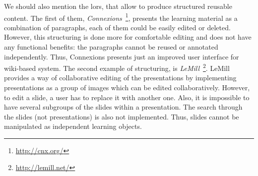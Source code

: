 \documentclass[PhD, Submit, ngerman,UKenglish,table]{scrbook}
\makeatletter
\newcommand{\todo}[1]{\textcolor{red}{@TODO: #1}}
\makeatother
\begin{document}
We should also mention the \gls{lor}s, that allow to produce structured reusable content.
The first of them, \emph{Connexions}~\footnote{\url{http://cnx.org/}}, presents the learning material as a combination of paragraphs, each of them could be easily edited or deleted.
However, this structuring is done more for comfortable editing and does not have any functional benefits: the paragraphs cannot be reused or annotated independently.
Thus, Connexions presents just an improved user interface for  wiki-based system.
The second example of structuring, is \emph{LeMill}~\footnote{\url{http://lemill.net/}}.
LeMill provides a way of collaborative editing of the presentations by implementing presentations as a group of images which can be edited collaboratively.
However, to edit a slide, a user has to replace it with another one.
Also, it is impossible to have several subgroups of the slides within a presentation.
The search through the slides (not presentations) is also not implemented.
Thus, slides cannot be manipulated as independent learning objects.


%
%
%
\end{document}
